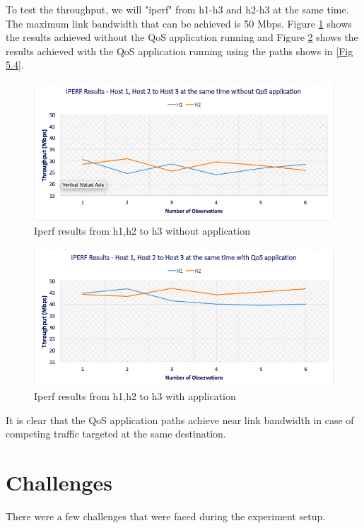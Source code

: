 \documentclass[paper=a4, fontsize=12pt]{scrartcl}	%
\numberwithin{equation}{section}		%
\numberwithin{figure}{section}			%
\numberwithin{table}{section}				%
\begin{document}
To test the throughput, we will "iperf" from h1-h3 and h2-h3 at the same time. The maximum link bandwidth that can be achieved is 50 Mbps. Figure \ref{Fig 5.5} shows the results achieved without the QoS application running and Figure \ref{Fig 5.6} shows the results achieved with the QoS application running using the paths shows in \ref{Fig 5.4}. 
\begin{figure}[H]
\begin{center}
\includegraphics[scale=0.45]{h123WO.png}   
\end{center}
 \caption{Iperf results from h1,h2 to h3 without application}
 \label{Fig 5.5}
\end{figure}
\begin{figure}[H]
\begin{center}
\includegraphics[scale=0.45]{h123W.png}   
\end{center}
 \caption{Iperf results from h1,h2 to h3 with application}
 \label{Fig 5.6}
\end{figure}
It is clear that the QoS application paths achieve near link bandwidth in case of competing traffic targeted at the same destination.
\section{Challenges}
There were a few challenges that were faced during the experiment setup.
\end{document}
